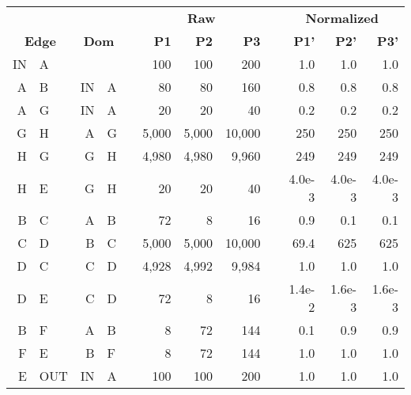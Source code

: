 

\begin{tabular}{r@{$\rightarrow$}lr@{$\rightarrow$}lr@{\hspace{0.01in}}rrrr@{\hspace{0.01in}}rrr}

\multicolumn{2}{c}{} & \multicolumn{2}{c}{} 
  & & \multicolumn{3}{c}{\bf Raw}
  & & \multicolumn{3}{c}{\bf Normalized} \\  \cline{6-8} \cline{10-12}
\multicolumn{2}{c}{\bf Edge} \T & \multicolumn{2}{c}{\bf Dom}
  & & {\bf P1}  & {\bf P2}  & {\bf P3}
  & & {\bf P1'} & {\bf P2'} & {\bf P3'} \\ \hline

IN&A \T & \multicolumn{2}{c}{} 
             &&   100   & 100   & 200     &&   1.0  & 1.0 & 1.0 \\
A&B   & IN&A &&   80    & 80    & 160     &&   0.8  & 0.8 & 0.8 \\
A&G   & IN&A &&   20    & 20    & 40      &&   0.2  & 0.2 & 0.2 \\
G&H   & A&G  &&   5,000 & 5,000 & 10,000  &&   250  & 250 & 250 \\
H&G   & G&H  &&   4,980 & 4,980 & 9,960   &&   249  & 249 & 249 \\
H&E   & G&H  &&   20    & 20    & 40      &&   4.0e-3  & 4.0e-3 & 4.0e-3 \\
B&C   & A&B  &&   72    & 8     & 16      &&   0.9  & 0.1 & 0.1 \\
C&D   & B&C  &&   5,000 & 5,000 & 10,000  &&   69.4 & 625 & 625 \\
D&C   & C&D  &&   4,928 & 4,992 & 9,984   &&   1.0  & 1.0 & 1.0 \\
D&E   & C&D  &&   72    & 8     & 16      &&   1.4e-2  & 1.6e-3 & 1.6e-3 \\
B&F   & A&B  &&   8     & 72    & 144     &&   0.1  & 0.9 & 0.9 \\
F&E   & B&F  &&   8     & 72    & 144     &&   1.0  & 1.0 & 1.0 \\
E&OUT & IN&A &&   100   & 100   & 200     &&   1.0  & 1.0 & 1.0 \\ \hline

\end{tabular}

